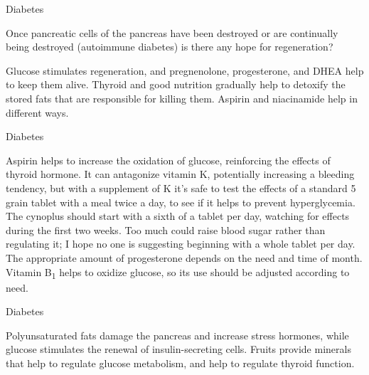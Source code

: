 \documentclass[11pt,oneside,openany,extrafontsizes]{memoir}
\begin{document}
\begin{qaexchange}{Diabetes}

    \begin{question}
        Once pancreatic cells of the pancreas have been destroyed or are continually being destroyed (autoimmune diabetes) is there any hope for regeneration?
    \end{question}

    \begin{answer}
      Glucose stimulates regeneration, and pregnenolone, progesterone, and DHEA help to keep them alive. Thyroid and good nutrition gradually help to detoxify the stored fats that are responsible for killing them. Aspirin and niacinamide help in different ways.
    \end{answer}
\end{qaexchange}

\begin{standalonequote}{Diabetes}

    \begin{answer}
      Aspirin helps to increase the oxidation of glucose, reinforcing the effects of thyroid hormone. It can antagonize vitamin K, potentially increasing a bleeding tendency, but with a supplement of K it's safe to test the effects of a standard 5 grain tablet with a meal twice a day, to see if it helps to prevent hyperglycemia. The cynoplus should start with a sixth of a tablet per day, watching for effects during the first two weeks. Too much could raise blood sugar rather than regulating it; I hope no one is suggesting beginning with a whole tablet per day. The appropriate amount of progesterone depends on the need and time of month. Vitamin B\textsubscript{1} helps to oxidize glucose, so its use should be adjusted according to need.
    \end{answer}
\end{standalonequote}

\begin{standalonequote}{Diabetes}

    \begin{answer}
      Polyunsaturated fats damage the pancreas and increase stress hormones, while glucose stimulates the renewal of insulin-secreting cells. Fruits provide minerals that help to regulate glucose metabolism, and help to regulate thyroid function.
    \end{answer}
\end{standalonequote}
\end{document}
